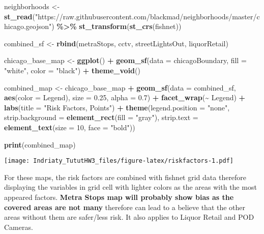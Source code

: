 \documentclass[
]{article}
\newenvironment{Shaded}{\begin{snugshade}}{\end{snugshade}}
\newcommand{\AttributeTok}[1]{\textcolor[rgb]{0.13,0.29,0.53}{#1}}
\newcommand{\DecValTok}[1]{\textcolor[rgb]{0.00,0.00,0.81}{#1}}
\newcommand{\FloatTok}[1]{\textcolor[rgb]{0.00,0.00,0.81}{#1}}
\newcommand{\FunctionTok}[1]{\textcolor[rgb]{0.13,0.29,0.53}{\textbf{#1}}}
\newcommand{\NormalTok}[1]{#1}
\newcommand{\OtherTok}[1]{\textcolor[rgb]{0.56,0.35,0.01}{#1}}
\newcommand{\SpecialCharTok}[1]{\textcolor[rgb]{0.81,0.36,0.00}{\textbf{#1}}}
\newcommand{\StringTok}[1]{\textcolor[rgb]{0.31,0.60,0.02}{#1}}
\begin{document}
\begin{Shaded}
\begin{Highlighting}[]
\NormalTok{neighborhoods }\OtherTok{\textless{}{-}} 
  \FunctionTok{st\_read}\NormalTok{(}\StringTok{"https://raw.githubusercontent.com/blackmad/neighborhoods/master/chicago.geojson"}\NormalTok{) }\SpecialCharTok{\%\textgreater{}\%}
  \FunctionTok{st\_transform}\NormalTok{(}\FunctionTok{st\_crs}\NormalTok{(fishnet)) }

\NormalTok{combined\_sf }\OtherTok{\textless{}{-}} \FunctionTok{rbind}\NormalTok{(metraStops, cctv, streetLightsOut, liquorRetail)}

\NormalTok{chicago\_base\_map }\OtherTok{\textless{}{-}} \FunctionTok{ggplot}\NormalTok{() }\SpecialCharTok{+}
  \FunctionTok{geom\_sf}\NormalTok{(}\AttributeTok{data =}\NormalTok{ chicagoBoundary, }\AttributeTok{fill =} \StringTok{"white"}\NormalTok{, }\AttributeTok{color =} \StringTok{"black"}\NormalTok{) }\SpecialCharTok{+}
  \FunctionTok{theme\_void}\NormalTok{()}

\NormalTok{combined\_map }\OtherTok{\textless{}{-}}\NormalTok{ chicago\_base\_map }\SpecialCharTok{+}
  \FunctionTok{geom\_sf}\NormalTok{(}\AttributeTok{data =}\NormalTok{ combined\_sf, }\FunctionTok{aes}\NormalTok{(}\AttributeTok{color =}\NormalTok{ Legend), }\AttributeTok{size =} \FloatTok{0.25}\NormalTok{, }\AttributeTok{alpha =} \FloatTok{0.7}\NormalTok{) }\SpecialCharTok{+}
  \FunctionTok{facet\_wrap}\NormalTok{(}\SpecialCharTok{\textasciitilde{}}\NormalTok{ Legend) }\SpecialCharTok{+}
  \FunctionTok{labs}\NormalTok{(}\AttributeTok{title =} \StringTok{"Risk Factors, Points"}\NormalTok{) }\SpecialCharTok{+}
  \FunctionTok{theme}\NormalTok{(}\AttributeTok{legend.position =} \StringTok{"none"}\NormalTok{, }
        \AttributeTok{strip.background =} \FunctionTok{element\_rect}\NormalTok{(}\AttributeTok{fill =} \StringTok{"gray"}\NormalTok{),}
        \AttributeTok{strip.text =} \FunctionTok{element\_text}\NormalTok{(}\AttributeTok{size =} \DecValTok{10}\NormalTok{, }\AttributeTok{face =} \StringTok{"bold"}\NormalTok{))}

\FunctionTok{print}\NormalTok{(combined\_map)}
\end{Highlighting}
\end{Shaded}

\texttt{[image: Indriaty\_TututHW3\_files/figure-latex/riskfactors-1.pdf]}

For these maps, the risk factors are combined with fishnet grid data
therefore displaying the variables in grid cell with lighter colors as
the areas with the most appeared factors. \textbf{Metra Stops map will
probably show bias as the covered areas are not many} therefore can lead
to a believe that the other areas without them are safer/less risk. It
also applies to Liquor Retail and POD Cameras.
\end{document}
